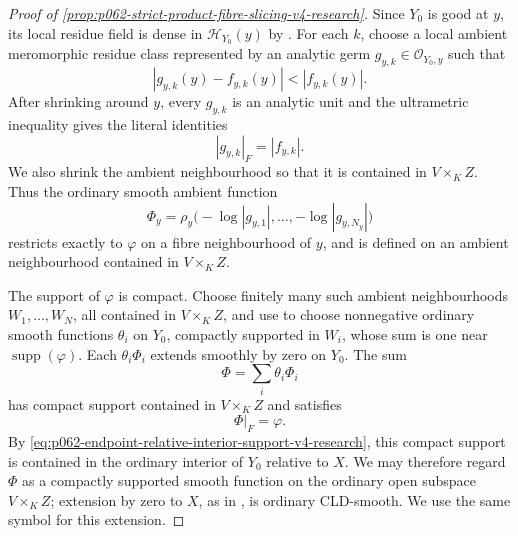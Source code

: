\begin{proof}[Proof of
\cref{prop:p062-strict-product-fibre-slicing-v4-research}]
Since \(Y_0\) is good at \(y\), its local residue field is dense in
\(\mathscr H_{Y_0}(y)\) by \cite[\S11.1.10]{CLD25}.  For each \(k\), choose
a local ambient meromorphic residue class represented by an analytic germ
\(g_{y,k}\in\mathcal O_{Y_0,y}\) such that
\begin{equation}\label{eq:p062-endpoint-moment-approximation-v4-research}
             |g_{y,k}(y)-f_{y,k}(y)|<|f_{y,k}(y)|.
\end{equation}
After shrinking around \(y\), every \(g_{y,k}\) is an analytic unit and
the ultrametric inequality gives the literal identities
\begin{equation}\label{eq:p062-endpoint-moment-equality-v4-research}
                    |g_{y,k}|_F=|f_{y,k}|.
\end{equation}
We also shrink the ambient neighbourhood so that it is contained in
\(V\times_KZ\).  Thus the ordinary smooth ambient function
\[
 \Phi_y=\rho_y\bigl(-\log|g_{y,1}|,\ldots,
                         -\log|g_{y,N_y}|\bigr)
\]
restricts exactly to \(\varphi\) on a fibre neighbourhood of \(y\), and is
defined on an ambient neighbourhood contained in \(V\times_KZ\).

The support of \(\varphi\) is compact.  Choose finitely many such ambient
neighbourhoods \(W_1,\ldots,W_N\), all contained in \(V\times_KZ\), and use
\cite[Corollary~15.2.9]{CLD25} to choose nonnegative ordinary smooth
functions \(\theta_i\) on \(Y_0\), compactly supported in \(W_i\), whose
sum is one near \(\operatorname{supp}(\varphi)\).  Each
\(\theta_i\Phi_i\) extends smoothly by zero on \(Y_0\).  The sum
\[
                              \Phi=\sum_i\theta_i\Phi_i
\]
has compact support contained in \(V\times_KZ\) and satisfies
\begin{equation}\label{eq:p062-endpoint-exact-spread-v4-research}
                              \Phi|_F=\varphi.
\end{equation}
By \eqref{eq:p062-endpoint-relative-interior-support-v4-research}, this
compact support is contained in the ordinary interior of \(Y_0\) relative
to \(X\).  We may therefore regard \(\Phi\) as a compactly supported smooth
function on the ordinary open subspace \(V\times_KZ\); extension by zero
to \(X\), as in \cite[Proposition~6.4.5(a)]{CLD25}, is ordinary CLD-smooth.
We use the same symbol for this extension.


\end{proof}
